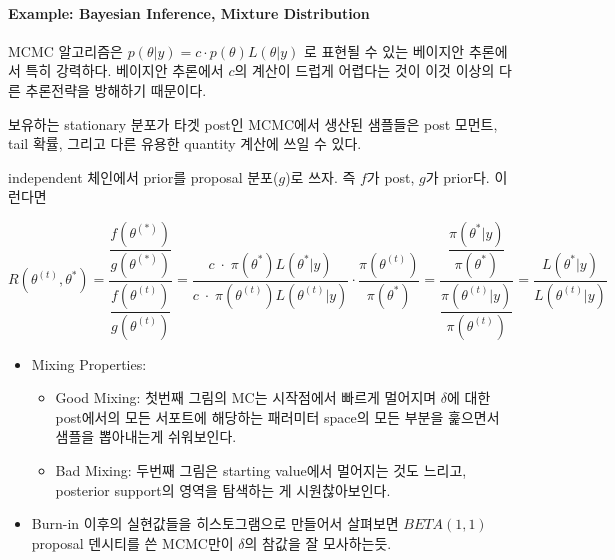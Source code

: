 \documentclass[
]{book}
\providecommand{\tightlist}{%
  \setlength{\itemsep}{0pt}\setlength{\parskip}{0pt}}
\begin{document}
\hypertarget{example-bayesian-inference-mixture-distribution}{%
\paragraph{Example: Bayesian Inference, Mixture Distribution}\label{example-bayesian-inference-mixture-distribution}}

MCMC 알고리즘은 \(p(\theta \rvert y ) = c \cdot p(\theta) L(\theta \rvert y)\) 로 표현될 수 있는 베이지안 추론에서 특히 강력하다. 베이지안 추론에서 \(c\)의 계산이 드럽게 어렵다는 것이 이것 이상의 다른 추론전략을 방해하기 때문이다.

보유하는 stationary 분포가 타겟 post인 MCMC에서 생산된 샘플들은 post 모먼트, tail 확률, 그리고 다른 유용한 quantity 계산에 쓰일 수 있다.

independent 체인에서 prior를 proposal 분포(\(g\))로 쓰자. 즉 \(f\)가 post, \(g\)가 prior다. 이런다면

\[
R ({\theta}^{(t)}, \theta^{\ast} ) 
=\dfrac
{\dfrac
{f(\theta^{( \ast )})}
{g(\theta^{( \ast )})}
}
{\dfrac
{f(\theta^{( t )})}
{g(\theta^{( t )})}
}
=\dfrac
{c \; \cdot \; \pi( \theta^{\ast} ) L( \theta^{\ast} \rvert y )}
{c \; \cdot \; \pi( \theta^{(t)} ) L( \theta^{(t)} \rvert y )}
\cdot
\dfrac { \pi (\theta^{(t)} )}{ \pi (\theta^{\ast})}
=\dfrac
{\dfrac
{\pi (\theta^{\ast} \rvert y)}
{\pi (\theta^{\ast})}
}
{\dfrac
{\pi (\theta^(t) \rvert y)}
{\pi (\theta^{(t)})}
}
= \dfrac
{L \left( \theta^{\ast} \rvert y \right)}
{L \left( \theta^{(t)} \rvert y \right)}
\]

\begin{itemize}
\tightlist
\item
  Mixing Properties:

  \begin{itemize}
  \tightlist
  \item
    Good Mixing: 첫번째 그림의 MC는 시작점에서 빠르게 멀어지며 \(\delta\)에 대한 post에서의 모든 서포트에 해당하는 패러미터 space의 모든 부분을 훑으면서 샘플을 뽑아내는게 쉬워보인다.
  \item
    Bad Mixing: 두번째 그림은 starting value에서 멀어지는 것도 느리고, posterior support의 영역을 탐색하는 게 시원찮아보인다.
  \end{itemize}
\item
  Burn-in 이후의 실현값들을 히스토그램으로 만들어서 살펴보면 \(BETA(1,1)\) proposal 덴시티를 쓴 MCMC만이 \(\delta\)의 참값을 잘 모사하는듯.
\end{itemize}

~\\
~\\
~\\
~\\
\end{document}
